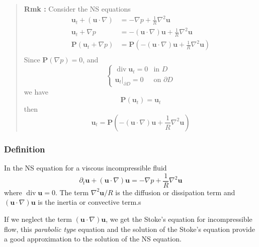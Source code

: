 \begin{quote}
	\textbf{Rmk :}
Consider the NS equations
\begin{equation}
\begin{aligned}
\textbf{u}_t + \left(\textbf{u}\cdot \nabla \right) &= - \nabla p + \frac{1}{R} \nabla^2 \textbf{u}\\
\textbf{u}_t + \nabla p &= -\left(\textbf{u}\cdot \nabla \right) \textbf{u} + \frac{1}{R}\nabla^2\textbf{u}\\
\mathbf{P}\left(\textbf{u}_t + \nabla p\right)
&= \mathbf{P}\left(-\left(\textbf{u}\cdot \nabla \right) \textbf{u} + \frac{1}{R}\nabla^2\textbf{u}\right)\\
\end{aligned}
\end{equation}
Since $\mathbf{P}(\nabla p) = 0$, and
\begin{equation}
\begin{cases}\operatorname{div}\textbf{u}_t=0&\text{in $D$}\\ \textbf{u}_t\big|_{\partial D} = 0&\text{on $\partial D$}\end{cases}
\end{equation}
we have
\begin{equation}
\mathbf{P}(\textbf{u}_t) = \textbf{u}_t
\end{equation}
then
\begin{equation}
\textbf{u}_t = \mathbf{P}\left(-\left(\textbf{u}\cdot \nabla \right) \textbf{u} + \frac{1}{R}\nabla^2\textbf{u}\right)
\end{equation}

\end{quote}
\subsubsection{Definition} %

In the NS equation for a viscous incompressible fluid
\begin{equation}
\partial_{t} \textbf{u} + \left(\textbf{u}\cdot\nabla\right)\textbf{u} = -\nabla p + \frac{1}{R}\nabla^2 \textbf{u}
\end{equation}
where $\operatorname{div}\textbf{u} = 0$. The term $\nabla^2 \textbf{u}/R$ is the diffusion or dissipation term and $\left(\textbf{u}\cdot\nabla\right)\textbf{u}$ is the inertia or convective term.s

If we neglect the term $\left(\textbf{u}\cdot\nabla\right)\textbf{u}$, we get the Stoke's equation for incompressible flow, this \textit{parabolic type} equation and the solution of the Stoke's equation provide a good approximation to the solution of the NS equation.


